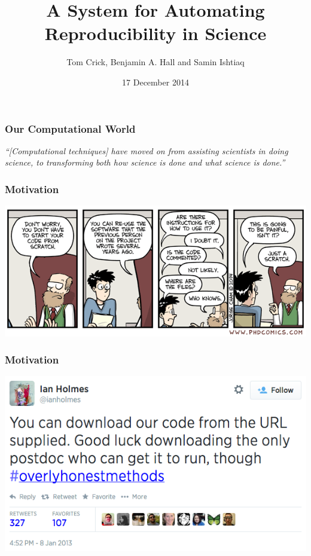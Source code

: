 \documentclass[pdftex]{beamer}
\title[Digital Science Catalyst Grant]{A System for Automating Reproducibility in Science}
\author[]{Tom Crick, Benjamin A. Hall and Samin Ishtiaq}
\institute[@DrTomCrick]{\url{https://github.com/tomcrick/DSCatalyst}}
\date{17 December 2014}
\begin{document}
\begin{frame}
\titlepage
\end{frame}



\begin{frame}
\frametitle{Our Computational World}
{\Large{{\emph{``[Computational techniques] have moved on from assisting scientists in 
doing science, to transforming both how science is 
done and what science is done.''}}}}\\
\end{frame}

\begin{frame}
\frametitle{Motivation}
\begin{center}
\includegraphics[width=0.9\paperwidth]{phd031214s.png}
\end{center}
\end{frame}

\begin{frame}
\frametitle{Motivation}
\begin{center}
\includegraphics[width=0.9\paperwidth]{overlyhonesttweet.png}
\end{center}
\end{frame}
\end{document}
